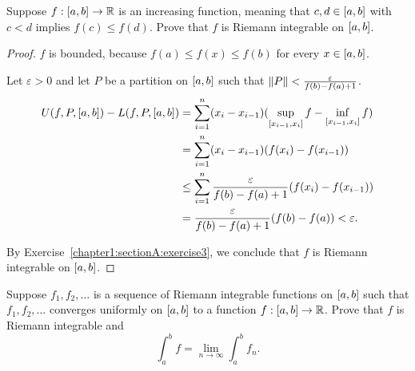 \begin{exercise}\label{chapter1:sectionA:exercise13}
    Suppose $f: \left[{a, b}\right]\to\mathbb{R}$ is an increasing function, meaning that $c, d\in\left[{a, b}\right]$ with $c < d$ implies $f(c)\leq f(d)$. Prove that $f$ is Riemann integrable on $\left[{a, b}\right]$.
\end{exercise}

\begin{proof}
    $f$ is bounded, because $f(a) \leq f(x) \leq f(b)$ for every $x\in\left[{a, b}\right]$.

    Let $\varepsilon > 0$ and let $P$ be a partition on $\left[{a, b}\right]$ such that $\left\Vert{P}\right\Vert < \frac{\varepsilon}{f(b) - f(a) + 1}$.
    \begin{align*}
        U(f, P, \left[{a, b}\right]) - L(f, P, \left[{a, b}\right]) & = \sum^{n}_{i=1}(x_{i} - x_{i-1})(\sup\limits_{\left[{x_{i-1},x_{i}}\right]}f - \inf\limits_{\left[{x_{i-1},x_{i}}\right]}f) \\
                                                                        & = \sum^{n}_{i=1}(x_{i} - x_{i-1})(f(x_{i}) - f(x_{i-1}))                                                                         \\
                                                                        & \leq \sum^{n}_{i=1}\frac{\varepsilon}{f(b) - f(a) + 1}(f(x_{i}) - f(x_{i-1}))                                                    \\
                                                                        & = \frac{\varepsilon}{f(b) - f(a) + 1}(f(b) - f(a)) < \varepsilon.
    \end{align*}

    By Exercise~\ref{chapter1:sectionA:exercise3}, we conclude that $f$ is Riemann integrable on $\left[{a, b}\right]$.
\end{proof}
\newpage

\begin{exercise}\label{chapter1:sectionA:exercise14}
    Suppose $f_{1}, f_{2}, \ldots$ is a sequence of Riemann integrable functions on $\left[{a,b}\right]$ such that $f_{1}, f_{2}, \ldots$ converges uniformly on $\left[{a,b}\right]$ to a function $f: \left[{a,b}\right]\to\mathbb{R}$. Prove that $f$ is Riemann integrable and
    \[
        \int^{b}_{a}f = \lim\limits_{n\to\infty}\int^{b}_{a}f_{n}.
    \]
\end{exercise}

